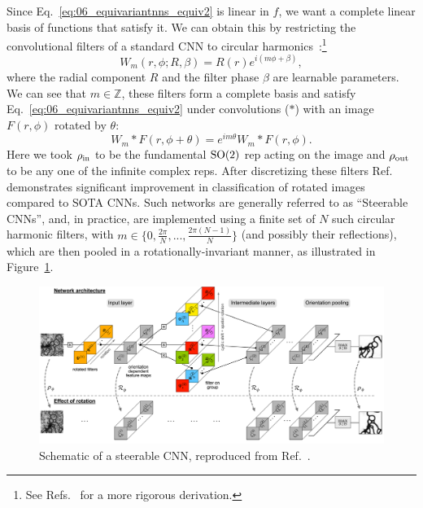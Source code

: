 Since Eq.~\ref{eq:06_equivariantnns_equiv2} is linear in $f$, we want a complete linear basis of functions that satisfy it.
We can obtain this by restricting the convolutional filters of a standard CNN to circular harmonics~\cite{worrall2017harmonic}:\footnote{See Refs.~\cite{weiler20183d, weiler2019general} for a more rigorous derivation.}  
\begin{equation}\label{eq:06_equivariantnns_circharms}
    W_m(r, \phi; R, \beta)=R(r)e^{i(m\phi + \beta)},
\end{equation}
where the radial component $R$ and the filter phase $\beta$ are learnable parameters. 
We can see that $m \in \mathbb Z$, these filters form a complete basis and satisfy Eq.~\ref{eq:06_equivariantnns_equiv2} under convolutions ($*$) with an image $F(r, \phi)$ rotated by $\theta$:
\begin{equation}
    W_m * F(r, \phi + \theta) = e^{im\theta} W_m * F(r, \phi).
\end{equation}
Here we took $\rho_\mathrm{in}$ to be the fundamental $\SO[2]$ rep acting on the image and $\rho_\mathrm{out}$ to be any one of the infinite complex reps. 
After discretizing these filters Ref.~\cite{worrall2017harmonic} demonstrates significant improvement in classification of rotated images compared to SOTA CNNs.
Such networks are generally referred to as ``Steerable CNNs'', and, in practice, are implemented using a finite set of $N$ such circular harmonic filters, with $m \in \{0, \frac{2\pi}{N}, ..., \frac{2\pi(N-1)}{N}\}$ (and possibly their reflections), which are then pooled in a rotationally-invariant manner, as illustrated in Figure~\ref{fig:06_equivariantnns_scnn}.

\begin{figure}[ht]
    \centering
    \captionsetup{justification=centering}
    \includegraphics[width=\textwidth]{figures/06-ML4Jets/equivariantnns/scnns}
    \caption{Schematic of a steerable CNN, reproduced from Ref.~\cite{weiler2018learning}.}
    \label{fig:06_equivariantnns_scnn}
\end{figure}


